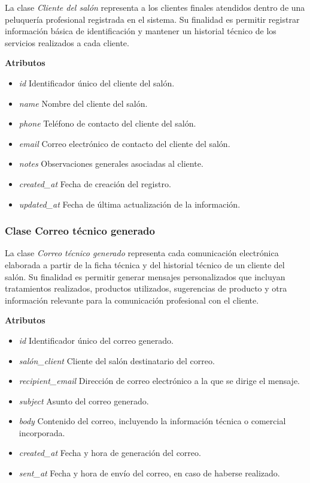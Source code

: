 La clase \textit{Cliente del salón} representa a los clientes finales atendidos dentro de una peluquería profesional registrada en el sistema. Su finalidad es permitir registrar información básica de identificación y mantener un historial técnico de los servicios realizados a cada cliente.

\textbf{Atributos}

\begin{itemize}

      \item \textit{id}
            Identificador único del cliente del salón.
      \item \textit{name}
            Nombre del cliente del salón.
      \item \textit{phone}
            Teléfono de contacto del cliente del salón.
      \item \textit{email}
            Correo electrónico de contacto del cliente del salón.
      \item \textit{notes}
            Observaciones generales asociadas al cliente.
      \item \textit{created\_at}
            Fecha de creación del registro.
      \item \textit{updated\_at}
            Fecha de última actualización de la información.

\end{itemize}

\subsubsection{Clase Correo técnico generado}

La clase \textit{Correo técnico generado} representa cada comunicación electrónica elaborada a partir de la ficha técnica y del historial técnico de un cliente del salón. Su finalidad es permitir generar mensajes personalizados que incluyan tratamientos realizados, productos utilizados, sugerencias de producto y otra información relevante para la comunicación profesional con el cliente.

\textbf{Atributos}

\begin{itemize}

      \item \textit{id}
            Identificador único del correo generado.
      \item \textit{salón\_client}
            Cliente del salón destinatario del correo.
      \item \textit{recipient\_email}
            Dirección de correo electrónico a la que se dirige el mensaje.
      \item \textit{subject}
            Asunto del correo generado.
      \item \textit{body}
            Contenido del correo, incluyendo la información técnica o comercial incorporada.
      \item \textit{created\_at}
            Fecha y hora de generación del correo.
      \item \textit{sent\_at}
            Fecha y hora de envío del correo, en caso de haberse realizado.

\end{itemize}

